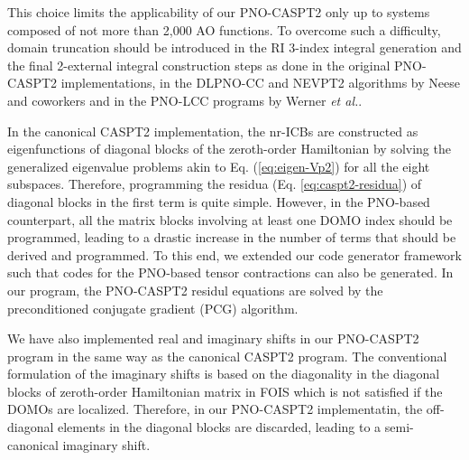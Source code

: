 \documentclass[aip,jcp,amsmath,twocolumn,floatfix,reprint,fleqn]{revtex4-1}
\begin{document}
%
This choice limits the applicability of our PNO-CASPT2 only up to systems composed of not more than 2,000 AO functions.
%
To overcome such a difficulty, domain truncation should be introduced in the RI 3-index integral generation and the final 2-external integral construction steps as done in the original PNO-CASPT2 implementations,\cite{:/content/aip/journal/jcp/145/12/10.1063/1.4963019,doi:10.1063/1.5097644} in the DLPNO-CC and NEVPT2 algorithms by Neese and coworkers\cite{riplingeran2013,riplingernatural2013,pinskisparse2015,riplingersparse2016,doi:10.1063/1.4981521,:/content/aip/journal/jcp/144/9/10.1063/1.4942769,dipayan2016,doi:10.1063/1.5027114} and in the PNO-LCC programs by Werner {\it et al.}.\cite{doi:10.1021/ct500725e,doi:10.1021/acs.jctc.5b00843,wernersdecay,doi:10.1021/acs.jctc.7b00554}

%
In the canonical CASPT2 implementation, the nr-ICBs are constructed as eigenfunctions of diagonal blocks of the zeroth-order Hamiltonian by solving the generalized eigenvalue problems akin to Eq. (\ref{eq:eigen-Vp2}) for all the eight subspaces.
%
Therefore, programming the residua (Eq. \ref{eq:caspt2-residua}) of diagonal blocks in the first term is quite simple.
%
However, in the PNO-based counterpart, all the matrix blocks involving at least one DOMO index should be programmed, leading to a drastic increase in the number of terms that should be derived and programmed.
%
To this end, we extended our code generator framework\cite{saitowmultireference2013,doi:10.1021/acs.jctc.5b00270} such that codes for the PNO-based tensor contractions can also be generated.
%
In our program, the PNO-CASPT2 residul equations are solved by the preconditioned conjugate gradient (PCG) algorithm.

%
We have also implemented real\cite{ROOS1995215} and imaginary\cite{FORSBERG1997196} shifts in our PNO-CASPT2 program in the same way as the canonical CASPT2 program.
%
The conventional formulation of the imaginary shifts is based on the diagonality in the diagonal blocks of zeroth-order Hamiltonian matrix in FOIS which is not satisfied if the DOMOs are localized.
%
Therefore, in our PNO-CASPT2 implementatin, the off-diagonal elements in the diagonal blocks are discarded, leading to a semi-canonical imaginary shift.
\end{document}
